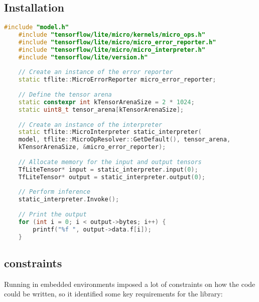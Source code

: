 \subsection{Installation}

\begin{lstlisting}[language=C++, caption={Run Inference with TensorFlow Lite Micro}, label={code:tflite-micro-inference}, style=bashstyle]
	#include "model.h"
	#include "tensorflow/lite/micro/kernels/micro_ops.h"
	#include "tensorflow/lite/micro/micro_error_reporter.h"
	#include "tensorflow/lite/micro/micro_interpreter.h"
	#include "tensorflow/lite/version.h"
	
	// Create an instance of the error reporter
	static tflite::MicroErrorReporter micro_error_reporter;
	
	// Define the tensor arena
	static constexpr int kTensorArenaSize = 2 * 1024;
	static uint8_t tensor_arena[kTensorArenaSize];
	
	// Create an instance of the interpreter
	static tflite::MicroInterpreter static_interpreter(
	model, tflite::MicroOpResolver::GetDefault(), tensor_arena,
	kTensorArenaSize, &micro_error_reporter);
	
	// Allocate memory for the input and output tensors
	TfLiteTensor* input = static_interpreter.input(0);
	TfLiteTensor* output = static_interpreter.output(0);
	
	// Perform inference
	static_interpreter.Invoke();
	
	// Print the output
	for (int i = 0; i < output->bytes; i++) {
		printf("%f ", output->data.f[i]);
	}
\end{lstlisting}


\subsection{constraints}

Running in embedded environments imposed a lot of constraints on how the code could be written, so it identified some key requirements for the library:

